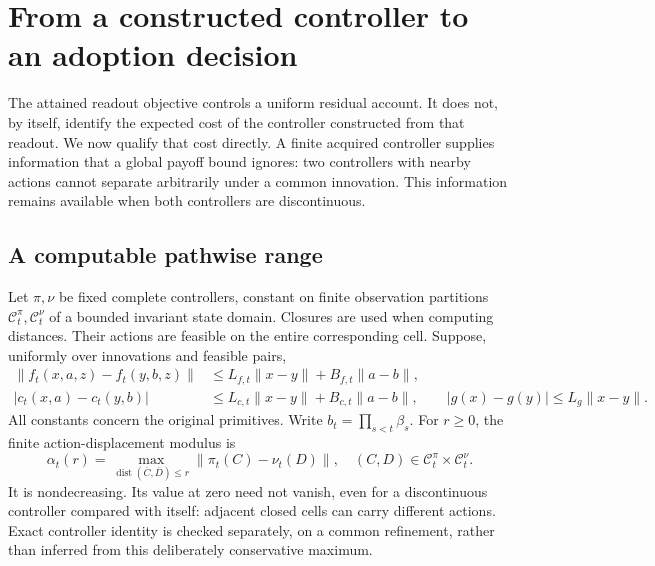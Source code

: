 \section{From a constructed controller to an adoption decision}\label{sec:displacement75}
The attained readout objective controls a uniform residual account. It does not, by itself, identify the expected cost of the controller constructed from that readout. We now qualify that cost directly. A finite acquired controller supplies information that a global payoff bound ignores: two controllers with nearby actions cannot separate arbitrarily under a common innovation. This information remains available when both controllers are discontinuous.

\subsection{A computable pathwise range}
Let $\pi,\nu$ be fixed complete controllers, constant on finite observation partitions $\mathcal C_t^\pi,\mathcal C_t^\nu$ of a bounded invariant state domain. Closures are used when computing distances. Their actions are feasible on the entire corresponding cell. Suppose, uniformly over innovations and feasible pairs,
\begin{align*}
 \|f_t(x,a,z)-f_t(y,b,z)\|&\le L_{f,t}\|x-y\|+B_{f,t}\|a-b\|,\\
 |c_t(x,a)-c_t(y,b)|&\le L_{c,t}\|x-y\|+B_{c,t}\|a-b\|,
 \qquad |g(x)-g(y)|\le L_g\|x-y\|.
\end{align*}
All constants concern the original primitives. Write $b_t=\prod_{s<t}\beta_s$. For $r\ge0$, the finite action-displacement modulus is
\begin{equation}\label{eq:cell-modulus75}
 \alpha_t(r)=\max_{\operatorname{dist}(\overline C,\overline D)\le r}
                 \|\pi_t(C)-\nu_t(D)\|,
 \quad (C,D)\in\mathcal C_t^\pi\times\mathcal C_t^\nu.
\end{equation}
It is nondecreasing. Its value at zero need not vanish, even for a discontinuous controller compared with itself: adjacent closed cells can carry different actions. Exact controller identity is checked separately, on a common refinement, rather than inferred from this deliberately conservative maximum.

